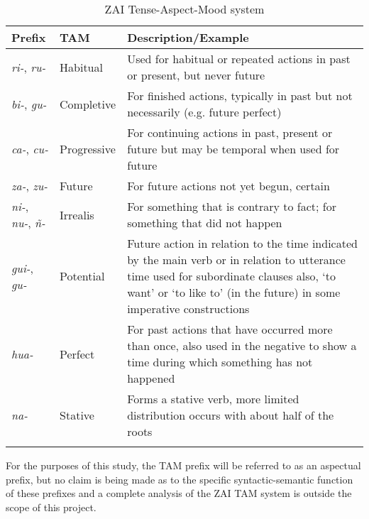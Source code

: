 \begin{table}

\begin{tabularx}{\textwidth}{llQ}
\lsptoprule
 Prefix & TAM & Description/Example \\
 
\midrule
\textit{ri-}, \textit{ru-} & Habitual & Used for habitual or repeated actions in past or present, but never future \\
 
\midrule
\textit{bi-}, \textit{gu-} & Completive & For finished actions, typically in past but not necessarily (e.g. future perfect) \\
 
\midrule
\textit{ca-}, \textit{cu-} &  Progressive & For continuing actions in past, present or future  but may be temporal when used for future \\
  
\midrule 
 \textit{za-}, \textit{zu-} & Future & For future actions not yet begun, certain \\
 
\midrule
 \textit{ni-}, \textit{nu-}, \textit{ñ-} & Irrealis & For something that is contrary to fact;  for something that did not happen \\
 
\midrule
\textit{gui-}, \textit{gu-} & Potential & Future action   in relation to the time indicated by the main verb   or in relation to utterance time  
 used for subordinate clauses  also, `to want' or `to like to' (in the future)  in some imperative constructions \\
 
\midrule
\textit{hua-} & Perfect & For past actions that have occurred more than once, also used in the negative to show a time   during which something has not happened \\
  
\midrule
\textit{na-} & Stative & Forms a stative verb,   more limited distribution occurs with about half of the roots \\
  
\lspbottomrule
 \end{tabularx}
\caption{{ZAI Tense-Aspect-Mood system}}
\label{TAMsystem}

\end{table} 

\largerpage
For the purposes of this study, the TAM prefix will be referred to as an aspectual prefix, but no claim is being made as to the specific syntactic-semantic function of these prefixes and a complete analysis of the ZAI TAM system is outside the scope of this project.

